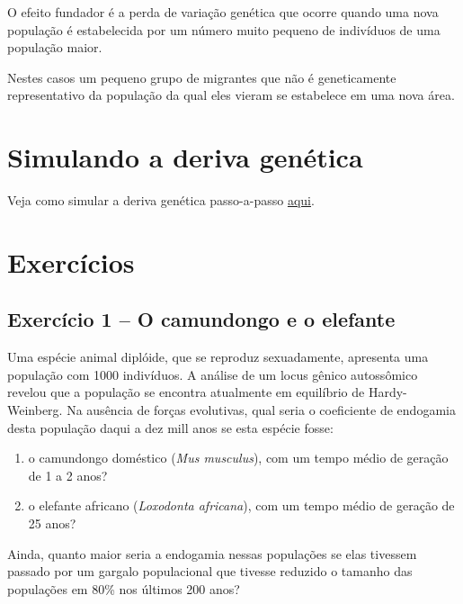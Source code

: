 \documentclass[
]{book}
\begin{document}
O efeito fundador é a perda de variação genética que ocorre quando uma nova população é estabelecida por um número muito pequeno de indivíduos de uma população maior.

Nestes casos um pequeno grupo de migrantes que não é geneticamente representativo da população da qual eles vieram se estabelece em uma nova área.

\hypertarget{simulando-a-deriva-genuxe9tica}{%
\section{Simulando a deriva genética}\label{simulando-a-deriva-genuxe9tica}}

Veja como simular a deriva genética passo-a-passo \protect\hyperlink{simulauxe7uxf5es-em-genuxe9tica-de-populauxe7uxf5es}{aqui}.

\hypertarget{exercuxedcios-4}{%
\section{Exercícios}\label{exercuxedcios-4}}

\hypertarget{exercuxedcio-1-o-camundongo-e-o-elefante}{%
\subsection{Exercício 1 -- O camundongo e o elefante}\label{exercuxedcio-1-o-camundongo-e-o-elefante}}

Uma espécie animal diplóide, que se reproduz sexuadamente, apresenta uma população com 1000 indivíduos. A análise de um locus gênico autossômico revelou que a população se encontra atualmente em equilíbrio de Hardy-Weinberg. Na ausência de forças evolutivas, qual seria o coeficiente de endogamia desta população daqui a dez mill anos se esta espécie fosse:

\begin{enumerate}
\def\labelenumi{\alph{enumi}.}
\item
  o camundongo doméstico (\emph{Mus musculus}), com um tempo médio de geração de 1 a 2 anos?
\item
  o elefante africano (\emph{Loxodonta africana}), com um tempo médio de geração de 25 anos?
\end{enumerate}

Ainda, quanto maior seria a endogamia nessas populações se elas tivessem passado por um gargalo populacional que tivesse reduzido o tamanho das populações em 80\% nos últimos 200 anos?
\end{document}
